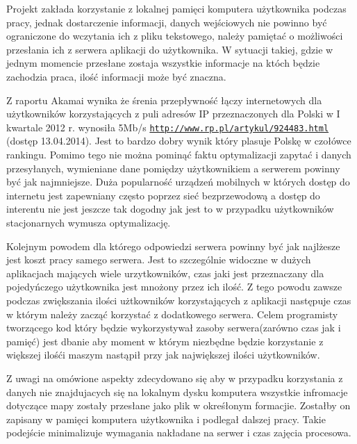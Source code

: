 Projekt zakłada korzystanie z lokalnej pamięci komputera użytkownika podczas pracy, jednak dostarczenie informacji, danych wejściowych nie powinno być ograniczone do wczytania ich z pliku tekstowego, należy pamiętać o możliwości przesłania ich z serwera aplikacji do użytkownika. W sytuacji takiej, gdzie w jednym momencie przesłane zostaja wszystkie informacje na któch będzie zachodzia praca, ilość informacji może być znaczna.

Z raportu Akamai wynika że śrenia przepływność łączy internetowych dla użytkowników korzystających z puli adresów IP przeznaczonych dla Polski w I kwartale 2012 r. wynosiła 5Mb/s  \underline{\texttt{http://www.rp.pl/artykul/924483.html}} (dostęp 13.04.2014). Jest to bardzo dobry wynik który plasuje Polskę w czołówce rankingu. Pomimo tego nie można pominąć faktu optymalizacji zapytać i danych przesyłanych, wymieniane dane pomiędzy użytkownikiem a serwerem powinny być jak najmniejsze. Duża popularność urządzeń mobilnych w których dostęp do internetu jest zapewniany często poprzez sieć bezprzewodową a dostęp do interentu nie jest jeszcze tak dogodny jak jest to w przypadku użytkowników stacjonarnych  wymusza optymalizację.

Kolejnym powodem dla którego odpowiedzi serwera powinny być jak najlżesze jest koszt pracy samego serwera. Jest to szczególnie widoczne w dużych aplikacjach mających wiele urzytkowników, czas jaki jest przeznaczany dla pojedyńczego użytkownika jest mnożony przez ich ilość. Z tego powodu zawsze podczas zwiększania ilości użtkowników korzystających z aplikacji następuje czas w którym należy zacząć korzystać z dodatkowego serwera. Celem programisty tworzącego kod który będzie wykorzystywał zasoby serwera(zarówno czas jak i pamięć) jest dbanie aby moment w którym niezbędne będzie korzystanie z większej ilośći maszym nastąpił przy jak największej ilości użytkowników.

Z uwagi na omówione aspekty zdecydowano się aby w przypadku korzystania z danych nie znajdujacych się na lokalnym dysku komputera wszystkie infromacje dotyczące mapy zostały przesłane jako plik w okreśłonym formacjie. Zostałby on zapisany w pamięci komputera użytkownika i podlegał dalszej pracy. Takie podejście minimalizuje wymagania nakładane na serwer i czas zajęcia procesowa.  

\newpage